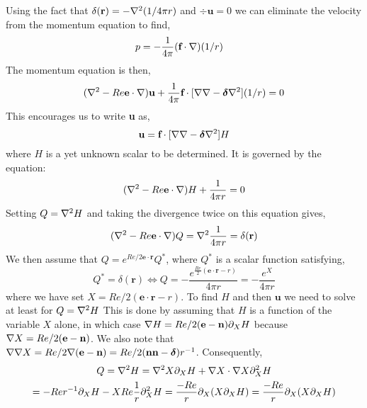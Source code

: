 Using the fact that $\delta(\textbf{r}) = -\mathbf{\nabla}^2 (1/4\pi r)$ and $\div \textbf{u}=0$ we can eliminate the velocity from the momentum equation to find, 
\begin{align}
    p 
    &= 
    -\frac{1}{4\pi} (\textbf{f} \cdot \mathbf{\nabla})  (1/r)
\end{align}
The momentum equation is then, 
\begin{equation}
    (\mathbf{\nabla}^2 
    - Re  \textbf{e} \cdot \mathbf{\nabla}) \textbf{u} 
    + \frac{1}{4\pi}\textbf{f}\cdot [\mathbf{\nabla}\mathbf{\nabla} - \bm\delta \mathbf{\nabla}^2](1/r)
    = 0
\end{equation}
This encourages us to write \textbf{u} as, 
\begin{equation}
    \textbf{u} = \textbf{f}\cdot [\mathbf{\nabla}\mathbf{\nabla} - \bm\delta \mathbf{\nabla}^2]H
\end{equation}
where $H$ is a yet unknown scalar to be determined. 
It is governed by the equation: 
\begin{equation}
    (\mathbf{\nabla}^2 
    - Re  \textbf{e} \cdot \mathbf{\nabla}) H 
    + \frac{1}{4\pi r}
    = 0
\end{equation}
Setting $Q=\mathbf{\nabla}^2 H$ and taking the divergence twice on this equation gives, 
\begin{equation}
    (\mathbf{\nabla}^2 
    - Re  \textbf{e} \cdot \mathbf{\nabla}) Q
    = 
    \mathbf{\nabla}^2\frac{1}{4\pi r}= \delta(\textbf{r})
\end{equation}
We then assume that $Q =e^{Re/2  \textbf{e}\cdot \textbf{r}} Q^* $, where $Q^*$ is a scalar function satisfying,
\begin{equation} 
    [\grad^2-(\frac{Re}{2})^2] Q^* 
    =
    \delta(\textbf{r})
    \Longleftrightarrow
    Q = - \frac{e^{\frac{Re}{2}(\textbf{e}\cdot \textbf{r} - r)}}{4\pi r}
    = - \frac{e^{X}}{4\pi r}
\end{equation}
where we have set $X = Re/2 (\textbf{e}\cdot \textbf{r}-r)$. 
To find $H$ and then $\textbf{u}$ we need to solve at least for  $Q = \mathbf{\nabla}^2  H$ 
This is done by assuming that $H$ is a function of the variable $X$ alone, in which case $\mathbf{\nabla} H = Re/2(\textbf{e} - \textbf{n}) \partial_X H$ because $\mathbf{\nabla} X =Re/2 (\textbf{e}-\textbf{n})$. We also note that $\mathbf{\nabla} \mathbf{\nabla} X = Re/2 \mathbf{\nabla} (\textbf{e}-\textbf{n}) = Re/2 (\textbf{nn}- \bm\delta)r^{-1}$. 
Consequently, 
\begin{multline}
    Q = \mathbf{\nabla}^2 H 
    = 
    \mathbf{\nabla}^2 X \partial_X H
    + \mathbf{\nabla} X \cdot \mathbf{\nabla} X \partial_X^2 H\\
    = - Re r^{-1} \partial_X H
    - X Re  \frac{1}{r} \partial_X^2 H
    = \frac{- Re }{r}\partial_X(X\partial_X H)
    = \frac{- Re }{r}\partial_X(X\partial_X H)
\end{multline}
